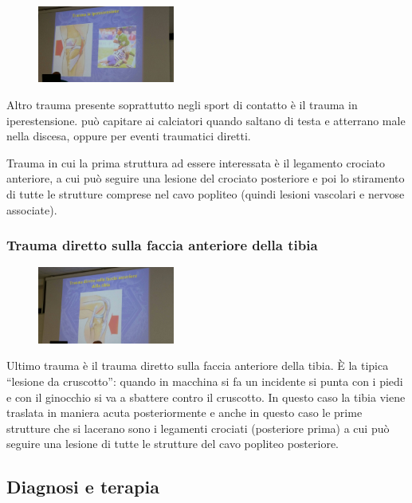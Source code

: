 \begin{figure}[!ht]
\centering
\includegraphics[width=0.4\textwidth]{008/image7.jpeg}
\end{figure}

Altro trauma presente soprattutto negli sport di contatto è il trauma in iperestensione. può capitare ai calciatori quando saltano di testa e atterrano male nella discesa, oppure per eventi traumatici diretti.

Trauma in cui la prima struttura ad essere interessata è il legamento crociato anteriore, a cui può seguire una lesione del crociato posteriore e poi lo stiramento di tutte le strutture comprese nel cavo popliteo (quindi lesioni vascolari e nervose associate).

\subsubsection{Trauma diretto sulla faccia anteriore della tibia}

\begin{figure}[!ht]
\centering
\includegraphics[width=0.4\textwidth]{008/image8.jpeg}
\end{figure}

Ultimo trauma è il trauma diretto sulla faccia anteriore della tibia. È la tipica ``lesione da cruscotto'': quando in macchina si fa un incidente si punta con i piedi e con il ginocchio si va a sbattere contro il cruscotto. In questo caso la tibia viene traslata in maniera acuta posteriormente e anche in questo caso le prime strutture che si lacerano sono i legamenti crociati (posteriore prima) a cui può seguire una lesione di tutte le strutture del cavo popliteo posteriore.

\subsection{Diagnosi e terapia}

